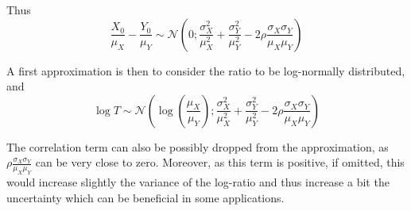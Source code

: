 \documentclass[../../Main_ManuscritThese.tex]{subfiles}
\begin{document}
  Thus
  \begin{equation}
    \frac{X_0}{\mu_X} - \frac{Y_0}{\mu_Y} \sim \mathcal{N}\left(0;\frac{\sigma^2_X}{\mu_X^2} + \frac{\sigma^2_Y}{\mu_Y^2} - 2 \rho \frac{\sigma_X \sigma_Y}{\mu_X \mu_Y} \right)
  \end{equation}
  
  A first approximation is then to consider the ratio to be log-normally distributed, and
  \begin{equation}
    \log T \sim \mathcal{N}\left(\log \left(\frac{\mu_X}{\mu_Y}\right); \frac{\sigma^2_X}{\mu_X^2} + \frac{\sigma^2_Y}{\mu_Y^2} - 2 \rho \frac{\sigma_X \sigma_Y}{\mu_X \mu_Y} \right)
  \end{equation}

  The correlation term can also be possibly dropped from the
  approximation, as $\rho \frac{\sigma_X \sigma_Y}{\mu_X \mu_Y}$ can
  be very close to zero. Moreover, as this term is positive, if
  omitted, this would increase slightly the variance of the log-ratio
  and thus increase a bit the uncertainty which can be beneficial in
  some applications.
  
\newpage
\end{document}
